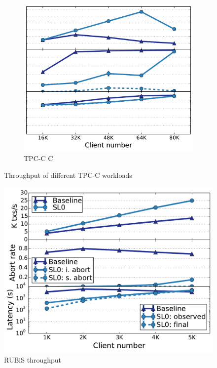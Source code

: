 \begin{figure}
\begin{minipage}{.73\textwidth}
\begin{subfigure}[t]{0.3\linewidth}
\end{subfigure}
\hspace{-4mm}
\begin{subfigure}[t]{0.3\linewidth}
\def\svgwidth{0.95\columnwidth}
\includegraphics[scale = 0.23]{figures/tpcc4543warehouse}
\caption{\scriptsize TPC-C C}
\label{fig:tpcc:c}
\end{subfigure}
\caption{Throughput of different TPC-C workloads}
\label{fig:tpcc_result}
\end{minipage}
\begin{minipage}{.25\textwidth}
\centering
  \includegraphics[scale=0.27]{figures/rubislatencywarehouse}
  \caption{RUBiS throughput}
  \label{fig:rubis}
\end{minipage}
\end{figure}

